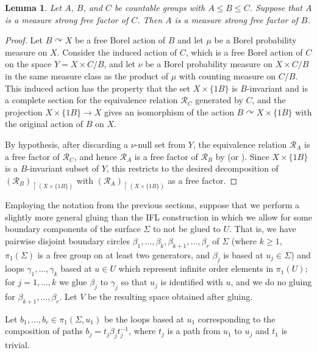 \documentclass[11pt]{amsart}
\theoremstyle{definition}
\theoremstyle{plain}
\newtheorem{lemma}[definition]{Lemma}
\newcommand{\<}{\langle}
\renewcommand{\>}{\rangle}
\begin{document}
\begin{lemma}\label{lem:ABC}
Let $A$, $B$, and $C$ be countable groups with $A\leq B\leq C$. Suppose that $A$ is a measure strong free factor of $C$. Then $A$ is a measure strong free factor of $B$.
\end{lemma}

\begin{proof}
Let $B\curvearrowright X$ be a free Borel action of $B$ and let $\mu$ be a Borel probability measure on $X$. Consider the induced action of $C$, which is a free Borel action of $C$ on the space $Y=X\times C/B$, and let $\nu$ be a Borel probability measure on $X\times C/B$ in the same measure class as the product of $\mu$ with counting measure on $C/B$. This induced action has the property that the set $X\times \{ 1B \}$ is $B$-invariant and is a complete section for the equivalence relation $\mathcal{R}_{C}$ generated by $C$, and the projection $X\times \{ 1B\} \rightarrow X$ gives an isomorphism of the action $B\curvearrowright X\times \{ 1B \}$ with the original action of $B$ on $X$.

By hypothesis, after discarding a $\nu$-null set from $Y$, the equivalence relation $\mathcal{R}_A$ is a free factor of $\mathcal{R}_C$, and hence $\mathcal{R}_A$ is a free factor of $\mathcal{R}_B$ by \cite[Th{\'e}or{\`e}me~1]{Alvarez} (or \cite[Theorem~3.2]{Alv-Gab}). Since $X\times \{ 1B\}$ is a $B$-invariant subset of $Y$, this restricts to the desired decomposition of $(\mathcal{R}_B)_{\restriction (X\times \{ 1B\} )}$ with $(\mathcal{R}_A)_{\restriction (X\times \{ 1B \} )}$ as a free factor.
\end{proof}

Employing the notation from the previous sections, suppose that we perform a slightly more general gluing than the IFL construction in which we allow for some boundary components of the surface $\Sigma$ to not be glued to $U$. That is, we have pairwise disjoint boundary circles $\beta _1,\dots , \beta _k, \beta _{k+1},\dots , \beta _r$ of $\Sigma$ (where $k\geq 1$, $\pi _1(\Sigma )$ is a free group on at least two generators, and $\beta _j$ is based at $u_j\in \Sigma$) and loops $\gamma _1,\dots ,\gamma _k$ based at $u\in U$ which represent infinite order elements in $\pi _1 (U)$; for $j=1,\dots , k$ we glue $\beta _j$ to $\gamma _j$ so that $u_j$ is identified with $u$, and we do no gluing for $\beta _{k+1},\dots , \beta _r$. Let $V$ be the resulting space obtained after gluing.

Let $b_1,\dots , b_r\in \pi _1(\Sigma , u_1)$ be the loops based at $u_1$ corresponding to the composition of paths $b_j=t_j\beta _jt_j^{-1}$, where $t_j$ is a path from $u_1$ to $u_j$ and $t_1$ is trivial.
\end{document}
